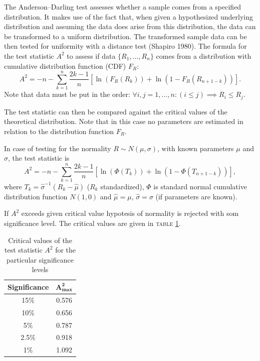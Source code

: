 \documentclass[a4paper,journal]{IEEEtran}
\begin{document}
The Anderson–Darling test assesses whether a sample comes from a specified distribution. It makes use of the fact that, 
when given a hypothesized underlying distribution and assuming the data does arise from this distribution, 
the data can be transformed to a uniform distribution. 
The transformed sample data can be then tested for uniformity with a distance test (Shapiro 1980).
The formula for the test statistic $A^2$ to assess if data $\{R_1,\ldots,R_n\}$ comes from a distribution with cumulative distribution function (CDF) $F_R$:
\begin{equation}
A^2=-n-\sum_{k=1}^n \frac{2k-1}{n}\left[\ln( F_R(R_k)) + \ln\left(1-F_R(R_{n+1-k})\right)\right].
\end{equation}
Note that data must be put in the order: $\forall i,j = 1,\ldots,n: (i \le j) \implies R_i \le R_j $.

The test statistic can then be compared against the critical values of the theoretical distribution.
Note that in this case no parameters are estimated in relation to the distribution function $F_R$.

In case of testing for the normality $R \sim N(\mu, \sigma)$, with known parameters $\mu$ and $\sigma$, 
the test statistic is
\begin{equation}
A^2=-n-\sum_{k=1}^n \frac{2k-1}{n}\left[\ln( \Phi(T_k)) + \ln\left(1-\Phi(T_{n+1-k})\right)\right],
\end{equation}
where $T_k = \hat\sigma^{-1}(R_k - \hat\mu)$ ($R_k$ standardized), 
$\Phi$ is standard normal cumulative distribution function $N(1,0)$
and  $\hat\mu = \mu$, $\hat\sigma = \sigma$ (if parameters are known). 

If $A^2$ exceeds given critical value hypotesis of normality is rejected with som significance level.
The critical values are given in \textsc{table \ref{tbl:crit}}.

\begin{table}[!h]
\caption{Critical values of the test statistic $A^2$ for the particular significance levels}
\begin{center}
\begin{tabular}{|c|c|}\hline
\textbf{Significance} & $\mathbf{A^2_{max}}$ \\ \hline
15\% & 0.576 \\ \hline
10\% & 0.656 \\ \hline
5\% & 0.787 \\ \hline
2.5\% & 0.918 \\ \hline
1\% & 1.092 \\ \hline
\end{tabular}
\end{center}
\label{tbl:crit}
\end{table}
\end{document}
